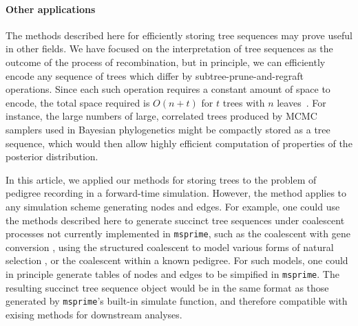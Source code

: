 \documentclass{article}
\newcommand{\msprime}{\texttt{msprime}}
\begin{document}

\paragraph{Other applications}
The methods described here for efficiently storing tree sequences may prove useful in other fields.
We have focused on the interpretation of tree sequences as the outcome of the process
of recombination, but in principle, we can efficiently encode any
sequence of trees which differ by subtree-prune-and-regraft
operations. Since each such operation requires a constant amount of space to encode, the total
space required is $O(n + t)$ for $t$ trees with $n$ leaves~\citep{kelleher2016efficient}.
For instance, the large numbers of large, correlated trees produced by
MCMC samplers used in Bayesian phylogenetics \citep[e.g.,][]{drummond2012bayesian}
might be compactly stored as a tree sequence,
which would then allow highly efficient computation of properties of the posterior distribution.

In this article, we applied our methods for storing trees to the problem of pedigree recording in a forward-time
simulation.  However, the method applies to any simulation scheme generating nodes and edges.  For example, one could
use the methods described here to generate succinct tree sequences under coalescent processes not currently implemented
in \msprime{}, such as the coalescent with gene conversion \citep{Wiuf2000-rc}, using the structured coalescent to
model various forms of natural selection \citep{Kaplan1988-in,Kaplan1989-rt,Braverman1995-gn},
or the coalescent within a known pedigree.  For such models, one
could in principle generate tables of nodes and edges to be simpified in \msprime{}.  The resulting succinct tree
sequence object would be in the same format as those generated by \msprime{}'s built-in simulate function, and therefore
compatible with exising methods for downstream analyses.
\end{document}
